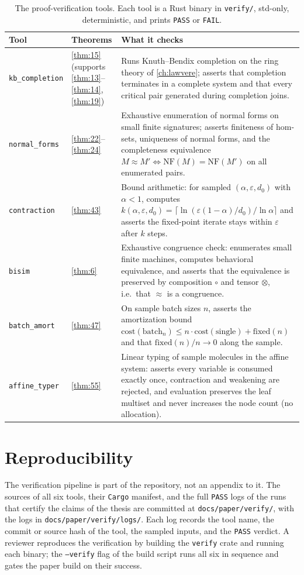 \begin{table}[!htbp]
\centering
\caption{The proof-verification tools. Each tool is a Rust binary in \texttt{verify/}, std-only, deterministic, and prints \texttt{PASS} or \texttt{FAIL}.}
\label{tab:verify-tools}
\small
\begin{tabular}{@{}llp{7.6cm}@{}}
\toprule
Tool & Theorems & What it checks\\
\midrule
\texttt{kb\_completion} & \ref{thm:15} (supports \ref{thm:13}--\ref{thm:14}, \ref{thm:19}) & Runs Knuth--Bendix completion on the ring theory of \autoref{ch:lawvere}; asserts that completion terminates in a complete system and that every critical pair generated during completion joins.\\
\texttt{normal\_forms} & \ref{thm:22}--\ref{thm:24} & Exhaustive enumeration of normal forms on small finite signatures; asserts finiteness of hom-sets, uniqueness of normal forms, and the completeness equivalence $M \approx M' \iff \mathrm{NF} (M) = \mathrm{NF} (M')$ on all enumerated pairs.\\
\texttt{contraction} & \ref{thm:43} & Bound arithmetic: for sampled $(\alpha, \varepsilon, d_0)$ with $\alpha < 1$, computes $k (\alpha,\varepsilon,d_0) = \lceil \ln (\varepsilon (1-\alpha)/d_0)/\ln\alpha\rceil$ and asserts the fixed-point iterate stays within $\varepsilon$ after $k$ steps.\\
\texttt{bisim} & \ref{thm:6} & Exhaustive congruence check: enumerates small finite machines, computes behavioral equivalence, and asserts that the equivalence is preserved by composition $\circ$ and tensor $\otimes$, i.e.\ that $\approx$ is a congruence.\\
\texttt{batch\_amort} & \ref{thm:47} & On sample batch sizes $n$, asserts the amortization bound $\mathrm{cost} (\mathrm{batch}_n) \le n\cdot\mathrm{cost} (\mathrm{single}) + \mathrm{fixed} (n)$ and that $\mathrm{fixed} (n)/n \to 0$ along the sample.\\
\texttt{affine\_typer} & \ref{thm:55} & Linear typing of sample molecules in the affine system: asserts every variable is consumed exactly once, contraction and weakening are rejected, and evaluation preserves the leaf multiset and never increases the node count (no allocation).\\
\bottomrule
\end{tabular}
\end{table}

\section{Reproducibility}
The verification pipeline is part of the repository, not an appendix to it. The sources of all six tools, their \texttt{Cargo} manifest, and the full \texttt{PASS} logs of the runs that certify the claims of the thesis are committed at \texttt{docs/paper/verify/}, with the logs in \texttt{docs/paper/verify/logs/}. Each log records the tool name, the commit or source hash of the tool, the sampled inputs, and the \texttt{PASS} verdict. A reviewer reproduces the verification by building the \texttt{verify} crate and running each binary; the \texttt{--verify} flag of the build script runs all six in sequence and gates the paper build on their success.

